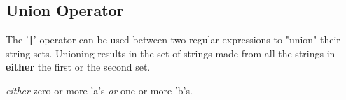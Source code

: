 
\subsection{Union Operator}
{
	The '\texttt{|}' operator can be used between two regular expressions to
	"union" their string sets.
	Unioning results in the set of strings made from all the strings in
	\textbf{either} the first or the second set.
	
	\begin{itemize}
	{
		\item[\texttt{"a"* | "b"+}] \textit{either} zero or more 'a's
			\textit{or} one or more 'b's.
	}
	\end{itemize}
}
